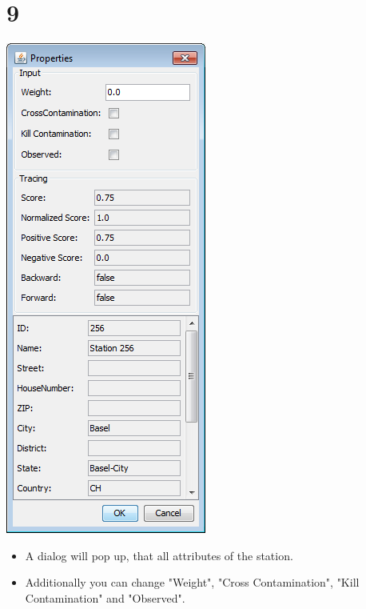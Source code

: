 \documentclass{beamer}
\begin{document}
\section{9}
\begin{frame}
	\begin{center}
  		\includegraphics[height=0.6\textheight]{9.png}
	\end{center}
	\begin{itemize}
		\item A dialog will pop up, that all attributes of the station.
		\item Additionally you can change "Weight", "Cross Contamination", "Kill Contamination" and "Observed".		
	\end{itemize}
\end{frame}
\end{document}
